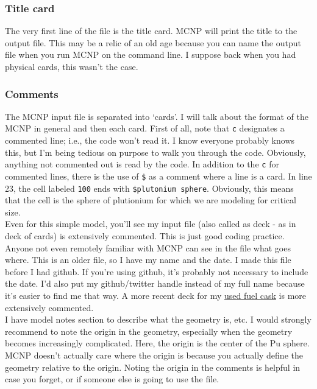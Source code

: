 \documentclass[11pt,a4paper]{article}
\begin{document}
\subsubsection{Title card}
\noindent The very first line of the file is the title card. MCNP will print the title to the output file. This may be a relic of an old age because you can name the output file when you run MCNP on the command line. I suppose back when you had physical cards, this wasn't the case. 

\subsubsection{Comments}
\noindent The MCNP input file is separated into `cards'. I will talk about the format of the MCNP in general and then each card. First of all, note that \texttt{c} designates a commented line; i.e., the code won't read it. I know everyone probably knows this, but I'm being tedious on purpose to walk you through the code. Obviously, anything not commented out is read by the code. In addition to the \texttt{c} for commented lines, there is the use of \texttt{\$} as a comment where a line is a card. In line 23, the cell labeled \texttt{100} ends with \texttt{\$plutonium sphere}. Obviously, this means that the cell is the sphere of plutionium for which we are modeling for critical size. \\

\noindent Even for this simple model, you'll see my input file (also called as deck - as in deck of cards) is extensively commented. This is just good coding practice. Anyone not even remotely familiar with MCNP can see in the file what goes where. This is an older file, so I have my name and the date. I made this file before I had github. If you're using github, it's probably not necessary to include the date. I'd also put my github/twitter handle instead of my full name because it's easier to
find me that way. A more recent deck for my \href{https://github.com/TheDoctorRAB/igem/blob/master/neutronics-shielding/low-burnup/L-3030/guide-assembly/container/air/borosilicate-glass-backfill/10cm/0wt/10wt/12cm/inp/single.assembly_7815.inp}{used fuel cask} is more extensively commented. \\

\noindent I have model notes section to describe what the geometry is, etc. I would strongly recommend to note the origin in the geometry, especially when the geometry becomes increasingly complicated. Here, the origin is the center of the Pu sphere. MCNP doesn't actually care where the origin is because you actually define the geometry relative to the origin. Noting the origin in the comments is helpful in case you forget, or if someone else is going to use the file. \\
\end{document}
